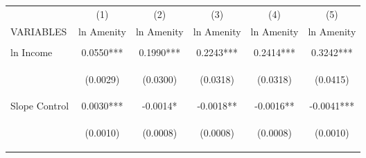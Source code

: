 
\begin{tabular}{lccccc} \hline
 & (1) & (2) & (3) & (4) & (5) \\
VARIABLES & ln Amenity & ln Amenity & ln Amenity & ln Amenity & ln Amenity \\ \hline
\vspace{4pt} & \begin{footnotesize}\end{footnotesize} & \begin{footnotesize}\end{footnotesize} & \begin{footnotesize}\end{footnotesize} & \begin{footnotesize}\end{footnotesize} & \begin{footnotesize}\end{footnotesize} \\
ln Income & 0.0550*** & 0.1990*** & 0.2243*** & 0.2414*** & 0.3242*** \\
\vspace{4pt} & \begin{footnotesize}(0.0029)\end{footnotesize} & \begin{footnotesize}(0.0300)\end{footnotesize} & \begin{footnotesize}(0.0318)\end{footnotesize} & \begin{footnotesize}(0.0318)\end{footnotesize} & \begin{footnotesize}(0.0415)\end{footnotesize} \\
Slope Control & 0.0030*** & -0.0014* & -0.0018** & -0.0016** & -0.0041*** \\
\vspace{4pt} & \begin{footnotesize}(0.0010)\end{footnotesize} & \begin{footnotesize}(0.0008)\end{footnotesize} & \begin{footnotesize}(0.0008)\end{footnotesize} & \begin{footnotesize}(0.0008)\end{footnotesize} & \begin{footnotesize}(0.0010)\end{footnotesize} \\

\end{tabular}
